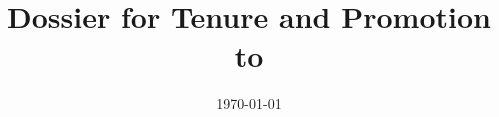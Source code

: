 \documentclass[12pt,a4paper]{article}
\title{Dossier for Tenure and Promotion to \newrank}
\date{\today}
\begin{document}
\begin{titlepage}
\maketitle
\end{titlepage}

\linespread{1.15} %

\tableofcontents

\newpage















\end{document}
